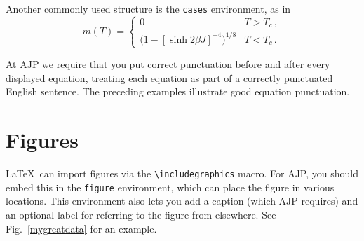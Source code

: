 \documentclass[prb,preprint]{revtex4-1}
\begin{document}
Another commonly used structure is the \texttt{cases} environment, as in
\begin{equation}
m(T) =
\begin{cases}
	0 & T > T_c \, , \\
	\bigl(1 - [\sinh 2 \beta J]^{-4} \bigr)^{1/8} & T < T_c \, .
\end{cases}
\end{equation}

At AJP we require that you put correct punctuation before and after every
displayed equation, treating each equation as part of a correctly punctuated
English sentence.\cite{mermin} The preceding examples illustrate good
equation punctuation.


\section{Figures}

\LaTeX\ can import figures via the \verb/\includegraphics/ macro.
For AJP, you should embed this in the \texttt{figure} environment, which 
can place the figure in various locations.  This environment also lets 
you add a caption (which AJP requires) and an optional label for referring 
to the figure from elsewhere.  See Fig.~\ref{mygreatdata} for an example.
\end{document}
